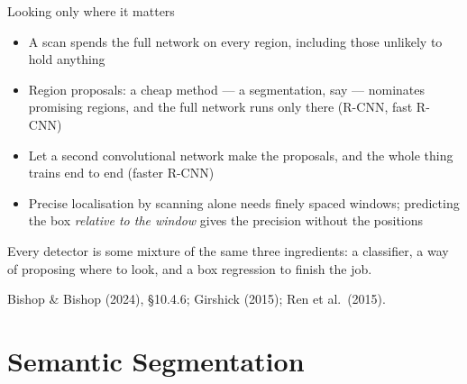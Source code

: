 \documentclass[aspectratio=169, 11pt]{beamer}
\newcommand{\srcline}[1]{%
  \par\vspace{0.25em}%
  {\scriptsize\color{mcMuted}\hfill #1\par}}
\newcommand{\src}[3]{}      %
\begin{document}
\begin{frame}{Looking only where it matters}
  \src{bishop2024}{section}{10.4.6}
  \src{girshick2015}{section}{2}
  \src{ren2015}{section}{3.1}
  \vspace{0.1em}
  {\footnotesize
  \begin{itemize}\itemsep0.30em
    \item A scan spends the full network on every region, including
          those unlikely to hold anything
    \item \alert{Region proposals}: a cheap method --- a segmentation,
          say --- nominates promising regions, and the full network runs
          only there (R-CNN, fast R-CNN)
    \item Let a second convolutional network make the proposals, and
          the whole thing trains end to end (faster R-CNN)
    \item Precise localisation by scanning alone needs finely spaced
          windows; predicting the box \emph{relative to the window}
          gives the precision without the positions
  \end{itemize}}
  \vspace{0.3em}
  \begin{redhighlight}
    Every detector is some mixture of the same three ingredients: a
    classifier, a way of proposing where to look, and a box regression
    to finish the job.
  \end{redhighlight}
  \srcline{Bishop \& Bishop (2024), \S10.4.6; Girshick (2015);
  Ren et al.\ (2015).}
\end{frame}

\section{Semantic Segmentation}
\end{document}
